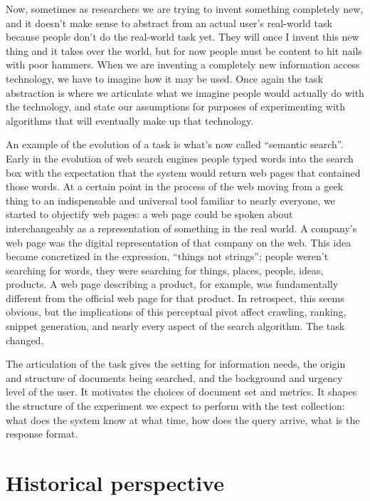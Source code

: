 \documentclass[nobib]{tufte-book}
\begin{document}
Now, sometimes as researchers we are trying to invent something completely new, and it doesn't make sense to abstract from an actual user's real-world task because people don't do the real-world task yet.  They will once I invent this new thing and it takes over the world, but for now people must be content to hit nails with poor hammers.  When we are inventing a completely new information access technology, we have to imagine how it may be used.  Once again the task abstraction is where we articulate what we imagine people would actually do with the technology, and state our assumptions for purposes of experimenting with algorithms that will eventually make up that technology.

An example of the evolution of a task is what's now called ``semantic search''.  Early in the evolution of web search engines people typed words into the search box with the expectation that the system would return web pages that contained those words.  At a certain point in the process of the web moving from a geek thing to an indispensable and universal tool familiar to nearly everyone, we started to objectify web pages: a web page could be spoken about interchangeably as a representation of something in the real world.  A company's web page was the digital representation of that company on the web.  This idea became concretized in the expression, ``things not strings'';\autocite{singhal_introducing_2012} people weren't searching for words, they were searching for things, places, people, ideas, products.  A web page describing a product, for example, was fundamentally different from the official web page for that product.  In retrospect, this seems obvious, but the implications of this perceptual pivot affect crawling, ranking, snippet generation, and nearly every aspect of the search algorithm.  The task changed.

The articulation of the task gives the setting for information needs, the origin and structure of documents being searched, and the background and urgency level of the user.  It motivates the choices of document set and metrics.  It shapes the structure of the experiment we expect to perform with the test collection: what does the system know at what time, how does the query arrive, what is the response format.

\section{Historical perspective}
\label{sec:historical}
\end{document}
